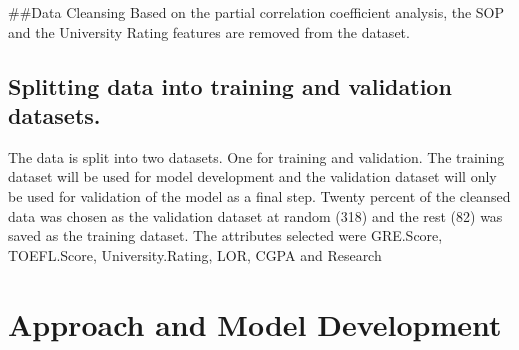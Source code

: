 \documentclass[11pt,]{article}
\newenvironment{Shaded}{\begin{snugshade}}{\end{snugshade}}
\newcommand{\CommentTok}[1]{\textcolor[rgb]{0.56,0.35,0.01}{\textit{#1}}}
\newcommand{\DataTypeTok}[1]{\textcolor[rgb]{0.13,0.29,0.53}{#1}}
\newcommand{\DecValTok}[1]{\textcolor[rgb]{0.00,0.00,0.81}{#1}}
\newcommand{\FloatTok}[1]{\textcolor[rgb]{0.00,0.00,0.81}{#1}}
\newcommand{\KeywordTok}[1]{\textcolor[rgb]{0.13,0.29,0.53}{\textbf{#1}}}
\newcommand{\NormalTok}[1]{#1}
\newcommand{\OperatorTok}[1]{\textcolor[rgb]{0.81,0.36,0.00}{\textbf{#1}}}
\begin{document}
\#\#Data Cleansing Based on the partial correlation coefficient
analysis, the SOP and the University Rating features are removed from
the dataset.

\begin{Shaded}
\end{Shaded}

\hypertarget{splitting-data-into-training-and-validation-datasets.}{%
\subsection{Splitting data into training and validation
datasets.}\label{splitting-data-into-training-and-validation-datasets.}}

The data is split into two datasets. One for training and validation.
The training dataset will be used for model development and the
validation dataset will only be used for validation of the model as a
final step. Twenty percent of the cleansed data was chosen as the
validation dataset at random (318) and the rest (82) was saved as the
training dataset. The attributes selected were GRE.Score, TOEFL.Score,
University.Rating, LOR, CGPA and Research

\begin{Shaded}
\end{Shaded}

\hypertarget{approach-and-model-development}{%
\section{Approach and Model
Development}\label{approach-and-model-development}}
\end{document}
